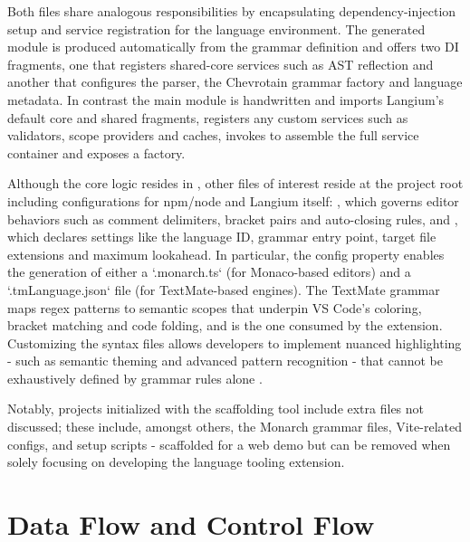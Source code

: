 Both  files share analogous responsibilities by encapsulating dependency-injection setup and service registration for the language environment.
The generated module is produced automatically from the grammar definition and offers two DI fragments, one that registers shared-core services such as AST
reflection and another that configures the parser, the Chevrotain grammar factory and language metadata. In contrast the main module is handwritten and imports
Langium's default core and shared fragments, registers any custom services such as validators, scope providers and caches, invokes  to assemble the full
service container and exposes a  factory.

Although the core logic resides in , other files of interest reside at the project root including configurations for npm/node and Langium itself:
, which governs editor behaviors such as comment delimiters, bracket pairs and auto-closing rules, and
, which declares settings like the language ID, grammar entry point, target file extensions and maximum lookahead.
In particular, the  config property enables the generation of either a `.monarch.ts` (for Monaco-based editors) and a `.tmLanguage.json` file (for TextMate-based engines).
The TextMate grammar maps regex patterns to semantic scopes that underpin VS Code's coloring, bracket
matching and code folding, and is the one consumed by the extension. Customizing the syntax files allows developers to implement nuanced highlighting
- such as semantic theming and advanced pattern recognition - that cannot be exhaustively defined by grammar rules alone \cite{EDKarlsson2022Discussion604}.

Notably, projects initialized with the scaffolding tool include extra files not discussed; these include, amongst others, the Monarch grammar files, Vite-related configs,
and setup scripts - scaffolded for a web demo but can be removed when solely focusing on developing the language tooling extension.

\section{Data Flow and Control Flow}

\vspace{0.5em}

